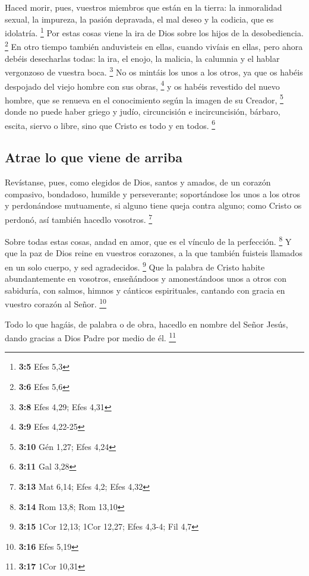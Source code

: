  Haced morir, pues, vuestros miembros que están en la
tierra: la inmoralidad sexual, la impureza, la pasión depravada, el mal
deseo y la codicia, que es idolatría. \footnote{\textbf{3:5} Efes 5,3}
 Por estas cosas viene la ira de Dios sobre los hijos de
la desobediencia. \footnote{\textbf{3:6} Efes 5,6}  En
otro tiempo también anduvisteis en ellas, cuando vivíais en ellas,
 pero ahora debéis desecharlas todas: la ira, el enojo, la
malicia, la calumnia y el hablar vergonzoso de vuestra boca. \footnote{\textbf{3:8}
  Efes 4,29; Efes 4,31}  No os mintáis los unos a los
otros, ya que os habéis despojado del viejo hombre con sus obras,
\footnote{\textbf{3:9} Efes 4,22-25}  y os habéis
revestido del nuevo hombre, que se renueva en el conocimiento según la
imagen de su Creador, \footnote{\textbf{3:10} Gén 1,27; Efes 4,24}
 donde no puede haber griego y judío, circuncisión e
incircuncisión, bárbaro, escita, siervo o libre, sino que Cristo es todo
y en todos. \footnote{\textbf{3:11} Gal 3,28}

\hypertarget{atrae-lo-que-viene-de-arriba}{%
\subsection{Atrae lo que viene de
arriba}\label{atrae-lo-que-viene-de-arriba}}

 Revístanse, pues, como elegidos de Dios, santos y
amados, de un corazón compasivo, bondadoso, humilde y perseverante;
 soportándose los unos a los otros y perdonándose
mutuamente, si alguno tiene queja contra alguno; como Cristo os perdonó,
así también hacedlo vosotros. \footnote{\textbf{3:13} Mat 6,14; Efes
  4,2; Efes 4,32}

 Sobre todas estas cosas, andad en amor, que es el
vínculo de la perfección. \footnote{\textbf{3:14} Rom 13,8; Rom 13,10}
 Y que la paz de Dios reine en vuestros corazones, a la
que también fuisteis llamados en un solo cuerpo, y sed agradecidos.
\footnote{\textbf{3:15} 1Cor 12,13; 1Cor 12,27; Efes 4,3-4; Fil 4,7}
 Que la palabra de Cristo habite abundantemente en
vosotros, enseñándoos y amonestándoos unos a otros con sabiduría, con
salmos, himnos y cánticos espirituales, cantando con gracia en vuestro
corazón al Señor. \footnote{\textbf{3:16} Efes 5,19}

 Todo lo que hagáis, de palabra o de obra, hacedlo en
nombre del Señor Jesús, dando gracias a Dios Padre por medio de él.
\footnote{\textbf{3:17} 1Cor 10,31}

